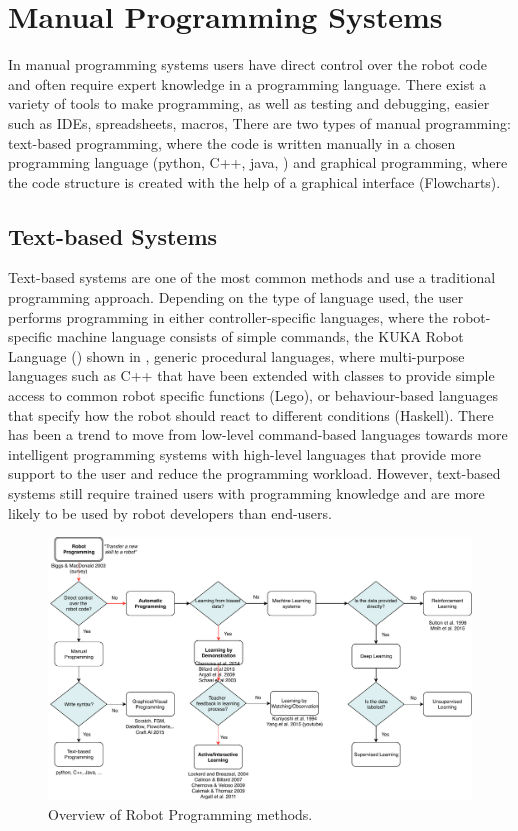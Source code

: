 \section{Manual Programming Systems}\label{subsec:Manual Programming Systems}
In manual programming systems users have direct control over the robot code
and often require expert knowledge in a programming language. %
There exist a variety of tools to make programming, as well as testing and debugging, easier such as IDEs, spreadsheets, macros, \etc 
There are two types of manual programming: text-based programming, where the code is written manually in a chosen programming language (python, C++, java, \etc) and graphical programming, where the code structure is created with the help of a graphical interface (\eg Flowcharts). 

\subsection{Text-based Systems}\label{sssec:Text-based Systems}
Text-based systems are one of the most common methods and use a traditional programming approach. 
Depending on the type of language used, the user performs programming in either controller-specific languages, where the robot-specific machine language consists of simple commands, \eg the KUKA Robot Language (\cite{braumann2011parametric,muhe2010reverse}) shown in ,
generic procedural languages, where multi-purpose languages such as C++ that have been extended with classes to provide simple access to common robot specific functions ({\eg Lego}), or behaviour-based languages that specify how the robot should react to different conditions (\eg Haskell). 
There has been a trend to move from low-level command-based languages towards more intelligent programming systems with high-level languages that provide more support to the user and reduce the programming workload.
However, text-based systems still require trained users with programming knowledge and are more likely to be used by robot developers than end-users.

\clearpage
\begin{figure}
	\centering
	\includegraphics[width=0.9\linewidth]{figures/RobotProgrammingOverview}
	\caption{Overview of Robot Programming methods.}
	\label{fig:RobotProgrammingOverview}
\end{figure}
\clearpage

